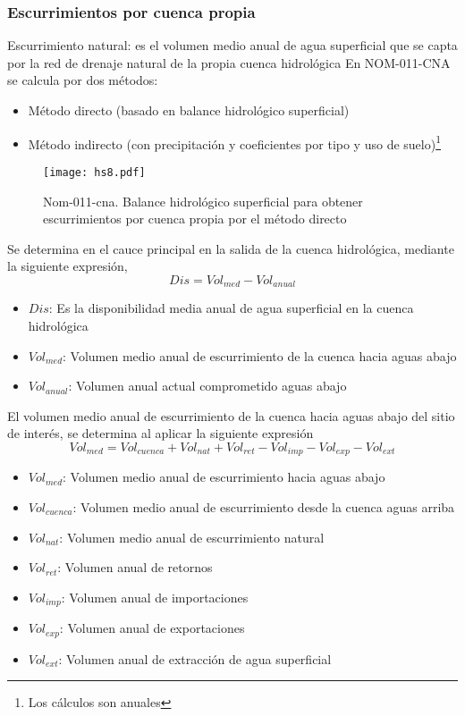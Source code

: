\subsubsection{Escurrimientos por cuenca propia}
Escurrimiento natural: es el volumen medio
anual de agua superficial que se capta por la
red de drenaje natural de la propia cuenca
hidrológica
En NOM-011-CNA se calcula por dos métodos:
\begin{itemize}
    \item Método directo (basado en balance hidrológico superficial)
    \item Método indirecto (con precipitación y coeficientes por tipo y uso de suelo)\footnote{Los cálculos son anuales}
\end{itemize}
\begin{figure}[h!]
\centering
  \texttt{[image: hs8.pdf]}
  \caption{Nom-011-cna. Balance hidrológico superficial para obtener escurrimientos por cuenca propia por el método directo}
  \label{hs8}
\end{figure}
Se determina en el cauce principal en la salida de la cuenca hidrológica, mediante la siguiente expresión, 
\begin{equation}
    Dis = Vol_{med} - Vol_{anual}
\end{equation}
\begin{notation}
    \begin{itemize}
        \item $Dis$: Es la disponibilidad media anual de agua superficial en la cuenca hidrológica
        \item $Vol_{med}$: Volumen medio anual de escurrimiento de la cuenca hacia aguas abajo
        \item $Vol_{anual}$: Volumen anual actual comprometido aguas abajo
    \end{itemize}
\end{notation}
El volumen medio anual de escurrimiento de la cuenca hacia aguas abajo del sitio de interés, se determina al aplicar la siguiente expresión
\begin{equation}
    Vol_{med} = Vol_{cuenca} + Vol_{nat} + Vol_{ret} - Vol_{imp} - Vol_{exp} - Vol_{ext}
\end{equation}
\begin{notation}
    \begin{itemize}
        \item $Vol_{med}$: Volumen medio anual de escurrimiento hacia aguas abajo
        \item $Vol_{cuenca}$: Volumen medio anual de escurrimiento desde la cuenca aguas arriba
        \item $Vol_{nat}$: Volumen medio anual de escurrimiento natural
        \item $Vol_{ret}$: Volumen anual de retornos
        \item $Vol_{imp}$: Volumen anual de importaciones
        \item $Vol_{exp}$: Volumen anual de exportaciones 
        \item $Vol_{ext}$: Volumen anual de extracción de agua superficial
    \end{itemize}
\end{notation}
